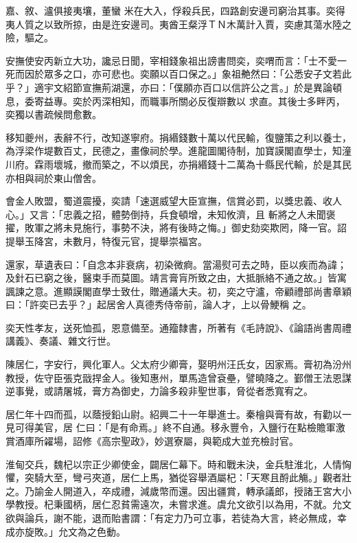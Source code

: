 \begin{pinyinscope}
 嘉、敘、瀘俱接夷壤，董蠻
 米在大入，俘殺兵民，四路創安邊司窮治其事。奕得夷人質之以致所掠，由是迕安邊司。夷酋王粲浮ＴＮ木萬計入賈，奕慮其蕩水陸之險，驅之。



 安撫使安丙新立大功，讒忌日聞，宰相錢象祖出謗書問奕，奕喟而言：「士不愛一死而因於眾多之口，亦可悲也。奕願以百口保之。」象祖艴然曰：「公悉安子文若此乎？」適宇文紹節宣撫荊湖還，亦曰：「僕願亦百口以信許公之言。」於是異論頓息，委寄益專。奕於丙深相知，而職事所關必反復辯數以
 求直。其後士多畔丙，奕獨以書疏候問愈數。



 移知夔州，表辭不行，改知遂寧府。捐緡錢數十萬以代民輸，復鹽策之利以養士，為浮梁作堤數百丈，民德之，畫像祠於學。進龍圖閣待制，加寶謨閣直學士，知潼川府。霖雨壞城，撤而築之，不以煩民，亦捐緡錢十二萬為十縣民代輸，於是其民亦相與祠於東山僧舍。



 會金人敗盟，蜀道震擾，奕請「速選威望大臣宣撫，信賞必罰，以獎忠義、收人心。」又言：「忠義之招，體勢倒持，兵食頓增，未知攸濟，且
 斬將之人未聞褒擢，敗軍之將未見施行，事勢不決，將有後時之悔。」御史劾奕欺罔，降一官。詔提舉玉降宮，未數月，特復元官，提舉崇福宮。



 還家，草遺表曰：「自念本非衰病，初染微痾。當湯熨可去之時，臣以疾而為諱；及針石已窮之後，醫束手而莫圖。靖言膏肓所致之由，大抵脈絡不通之故。」皆寓諷諫之意。進顯謨閣直學士致仕，贈通議大夫。初，奕之守瀘，帝顧禮部尚書章穎曰：「許奕已去乎？」起居舍人真德秀侍帝前，論人才，上以骨鯁稱
 之。



 奕天性孝友，送死恤孤，恩意備至。通籀隸書，所著有《毛詩說》、《論語尚書周禮講義》、奏議、雜文行世。



 陳居仁，字安行，興化軍人。父太府少卿膏，娶明州汪氏女，因家焉。膏初為汾州教授，佐守臣張克戩捍金人。後知惠州，單馬造曾袞壘，譬曉降之。鄞僧王法恩謀逆事覺，或請屠城，膏方為御史，力論多殺非聖世事，脅從者悉寬宥之。



 居仁年十四而孤，以蔭授鉛山尉。紹興二十一年舉進士。秦檜與膏有故，有勸以一見可得美官，居
 仁曰：「是有命焉。」終不自通。移永豐令，入鹽行在點檢贍軍激賞酒庫所糴場，詔修《高宗聖政》，妙選寮屬，與範成大並充檢討官。



 淮甸交兵，魏杞以宗正少卿使金，闢居仁幕下。時和戰未決，金兵駐淮北，人情恟懼，突騎大至，彎弓夾道，居仁上馬，猶從容舉酒屬杞：「天寒且酹此觴。」觀者壯之。乃諭金人開道入，卒成禮，減歲幣而還。因出疆賞，轉承議郎，授諸王宮大小學教授。杞秉國柄，居仁忍貧需遠次，未嘗求進。虞允文欲引以為用，不就。允文
 欲與論兵，謝不能，退而貽書謂：「有定力乃可立事，若徒為大言，終必無成，幸成亦旋敗。」允文為之色動。




\end{pinyinscope}
